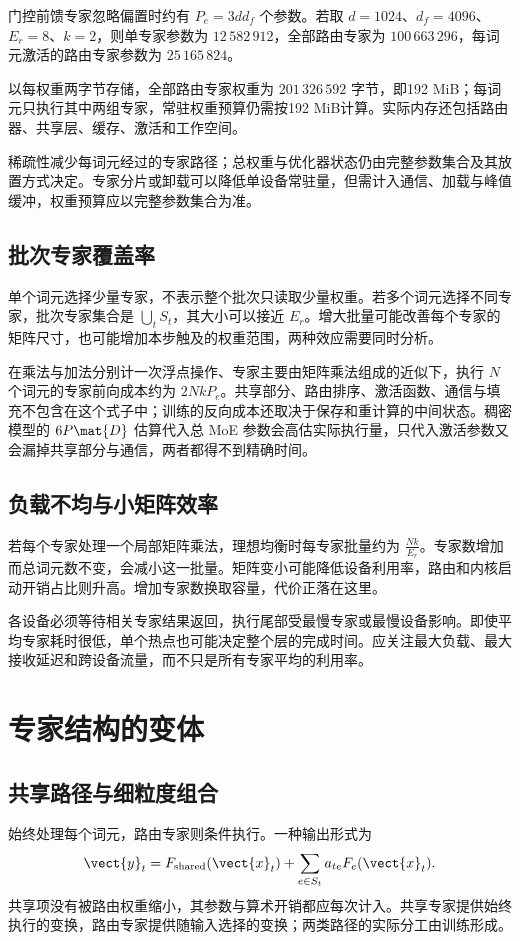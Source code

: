 \documentclass[../textbook.tex]{subfiles}
\begin{document}
门控前馈专家忽略偏置时约有 $P_e=3dd_f$ 个参数。若取 $d=1024$、$d_f=4096$、$E_r=8$、$k=2$，则单专家参数为 $12\,582\,912$，全部路由专家为 $100\,663\,296$，每词元激活的路由专家参数为 $25\,165\,824$。

以每权重两字节存储，全部路由专家权重为 $201\,326\,592$ 字节，即192 MiB；每词元只执行其中两组专家，常驻权重预算仍需按192 MiB计算。实际内存还包括路由器、共享层、缓存、激活和工作空间。

\begin{warning}[专家参数与驻留容量]
稀疏性减少每词元经过的专家路径；总权重与优化器状态仍由完整参数集合及其放置方式决定。专家分片或卸载可以降低单设备常驻量，但需计入通信、加载与峰值缓冲，权重预算应以完整参数集合为准。
\end{warning}

\subsection{批次专家覆盖率}
单个词元选择少量专家，不表示整个批次只读取少量权重。若多个词元选择不同专家，批次专家集合是 $\bigcup_tS_t$，其大小可以接近 $E_r$。增大批量可能改善每个专家的矩阵尺寸，也可能增加本步触及的权重范围，两种效应需要同时分析。

在乘法与加法分别计一次浮点操作、专家主要由矩阵乘法组成的近似下，执行 $N$ 个词元的专家前向成本约为 $2NkP_e$。共享部分、路由排序、激活函数、通信与填充不包含在这个式子中；训练的反向成本还取决于保存和重计算的中间状态。稠密模型的 $6P\mat{D}$ 估算代入总 MoE 参数会高估实际执行量，只代入激活参数又会漏掉共享部分与通信，两者都得不到精确时间。

\subsection{负载不均与小矩阵效率}
若每个专家处理一个局部矩阵乘法，理想均衡时每专家批量约为 $\frac{Nk}{E_r}$。专家数增加而总词元数不变，会减小这一批量。矩阵变小可能降低设备利用率，路由和内核启动开销占比则升高。增加专家数换取容量，代价正落在这里。

各设备必须等待相关专家结果返回，执行尾部受最慢专家或最慢设备影响。即使平均专家耗时很低，单个热点也可能决定整个层的完成时间。应关注最大负载、最大接收延迟和跨设备流量，而不只是所有专家平均的利用率。

\section{专家结构的变体}
\optional
\subsection{共享路径与细粒度组合}
始终处理每个词元，路由专家则条件执行。一种输出形式为
\begin{equation}
 \vect{y}_t=F_{\mathrm{shared}}(\vect{x}_t)+\sum_{e\in S_t}a_{te}F_e(\vect{x}_t).
\end{equation}
共享项没有被路由权重缩小，其参数与算术开销都应每次计入。共享专家提供始终执行的变换，路由专家提供随输入选择的变换；两类路径的实际分工由训练形成。
\end{document}
